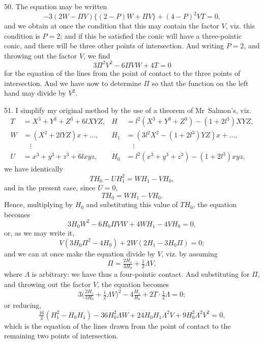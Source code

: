 \documentclass[11pt,a4paper]{book}
\begin{document}
50. The equation may be written
\[
-3(2W-\Pi V)\{(2-P)W+\Pi V\}+(4-P)^2VT=0,
\]
and we obtain at once the condition that this may contain the factor $V$, viz. this condition is $P=2$; and if this be satisfied the conic will have a three-pointic conic, and there will be three other points of intersection. And writing $P=2$, and throwing out the factor $V$, we find
\[
3\Pi^2V^2-6\Pi VW+4T=0
\]
for the equation of the lines from the point of contact to the three points of intersection. And we have now to determine $\Pi$ so that the function on the left hand may divide by $V^2$.

51. I simplify my original method by the use of a theorem of Mr~Salmon's, viz.
\begin{align*}
T &= X^3+Y^3+Z^3+6lXYZ, & H &= l^2(X^3+Y^3+Z^3)-(1+2l^3)XYZ,\\
W &= (X^2+2lYZ)x+\ldots, & H_1 &= (3l^2X^2-(1+2l^3)YZ)x+\ldots,\\
&\quad\vdots & &\quad\vdots\\
U &= x^3+y^3+z^3+6lxyz, & H_0 &= l^2(x^3+y^3+z^3)-(1+2l^3)xyz,
\end{align*}
we have identically
\[
TH_0-UH_1^2=WH_1-VH_0,
\]
and in the present case, since $U=0$,
\[
TH_0=WH_1-VH_0.
\]
Hence, multiplying by $H_0$ and substituting this value of $TH_0$, the equation becomes
\[
3H_0W^2-6H_0\Pi VW+4WH_1-4VH_0=0,
\]
or, as we may write it,
\[
V(3H_0\Pi^2-4H_0)+2W(2H_1-3H_0\Pi)=0;
\]
and we can at once make the equation divide by $V$, viz. by assuming
\[
\Pi=\tfrac{2H_1}{3H_0}+\tfrac{1}{2}\Lambda V,
\]
where $\Lambda$ is arbitrary: we have thus a four-pointic contact. And substituting for $\Pi$, and throwing out the factor $V$, the equation becomes
\[
3\bigl(\tfrac{2H_1}{3H_0}+\tfrac{1}{2}\Lambda V\bigr)^2-4\tfrac{H_1}{H_0}+2T\cdot\tfrac{1}{2}\Lambda=0;
\]
or reducing,
\[
\tfrac{16}{3}(H_1^2-H_0H_1)-36H_0^2\Lambda W+24H_0H_1\Lambda^2V+9H_0^2\Lambda^2V^2=0,
\]
which is the equation of the lines drawn from the point of contact to the remaining two points of intersection.
\end{document}
